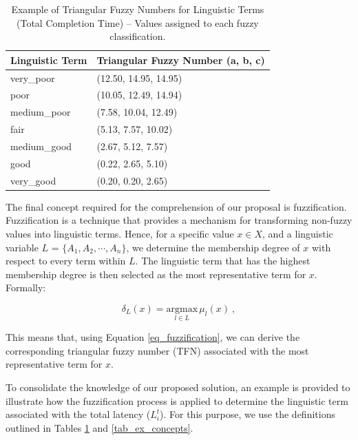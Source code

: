 \documentclass[iicol]{sn-jnl}
\begin{document}
\begin{table}[!ht]
    \centering
    \caption{Example of Triangular Fuzzy Numbers for Linguistic Terms (Total Completion Time) – Values assigned to each fuzzy classification.}
    \label{tab_fuzzy_numbers}
    \begin{tabular}{lp{\twocolumns}}
        \toprule
        \textbf{Linguistic Term} & \textbf{Triangular Fuzzy Number (a, b, c)} \\
        \midrule
        very\_poor &  (12.50, 14.95, 14.95) \\
        poor & (10.05, 12.49, 14.94) \\
        medium\_poor & (7.58, 10.04, 12.49) \\
        fair & (5.13, 7.57, 10.02) \\
        medium\_good & (2.67, 5.12, 7.57) \\
        good & (0.22, 2.65, 5.10) \\
        very\_good &(0.20, 0.20, 2.65) \\
        \bottomrule
    \end{tabular}
\end{table}

The final concept required for the comprehension of our proposal is fuzzification. Fuzzification is a technique that provides a mechanism for transforming non-fuzzy values into linguistic terms. Hence, for a specific value $x \in X$, and a linguistic variable $L$ = $\{A_1, A_2, \cdots, A_n\}$, we determine the membership degree of $x$ with respect to every term within $L$. The linguistic term that has the highest membership degree is then selected as the most representative term for $x$. Formally:

\begin{equation}\label{eq_fuzzification}
    \delta_L(x) = \underset{l \in L}{\text{argmax}} \, \mu_l(x)~,
\end{equation}

This means that, using Equation \eqref{eq_fuzzification}, we can derive the corresponding triangular fuzzy number (TFN) associated with the most representative term for $x$.

To consolidate the knowledge of our proposed solution, an example is provided to illustrate how the fuzzification process is applied to determine the linguistic term associated with the total latency ($L^t_i$). For this purpose, we use the definitions outlined in Tables \ref{tab_fuzzy_numbers} and \ref{tab_ex_concepts}.
\end{document}
